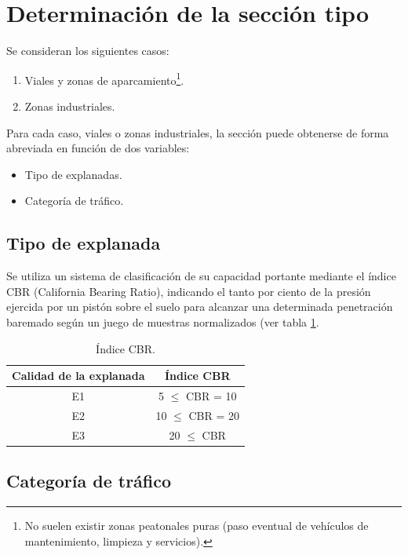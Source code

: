 \section{Determinación de la sección tipo}\label{sec:secciontipo}

Se consideran los siguientes casos:

\begin{enumerate}
\item Viales y zonas de aparcamiento\footnote{No suelen existir zonas peatonales puras (paso eventual de vehículos de mantenimiento, limpieza y servicios).}.
\item Zonas industriales.
\end{enumerate}


Para cada caso, viales o zonas industriales, la sección puede obtenerse de forma abreviada en función de dos variables:
\begin{itemize}
\item Tipo de explanadas.
\item Categoría de tráfico.
\end{itemize}

\subsection{Tipo de explanada}

Se utiliza un sistema de clasificación de su capacidad portante mediante el índice CBR (California Bearing Ratio), indicando el tanto por ciento de la presión ejercida por un pistón sobre el suelo para alcanzar una determinada penetración baremado según un juego de muestras normalizados (ver tabla \ref{indicecbr}.

\begin{table}[!htb]
\centering
\begin{tabular}{cc}
\toprule
Calidad de la explanada & Índice CBR\\
\midrule
E1 & 5 $\leq$ CBR = 10\\
E2 & 10 $\leq$ CBR = 20\\
E3 & 20 $\leq$ CBR\\
\bottomrule
\end{tabular}
\caption{Índice CBR.}
\label{indicecbr}
\end{table}


\subsection{Categoría de tráfico}

